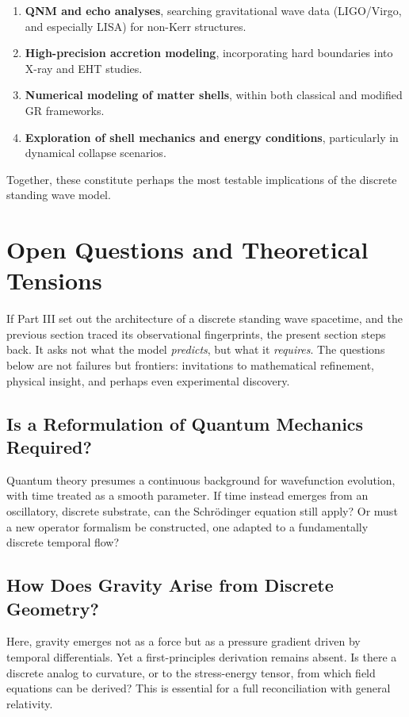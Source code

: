 \documentclass[12pt]{article}
\begin{document}
\begin{enumerate}
    \item \textbf{QNM and echo analyses}, searching gravitational wave data (LIGO/Virgo, and especially LISA) for non-Kerr structures.
    \item \textbf{High-precision accretion modeling}, incorporating hard boundaries into X-ray and EHT studies.
    \item \textbf{Numerical modeling of matter shells}, within both classical and modified GR frameworks.
    \item \textbf{Exploration of shell mechanics and energy conditions}, particularly in dynamical collapse scenarios.
\end{enumerate}

Together, these constitute perhaps the most testable implications of the discrete standing wave model.

\section{Open Questions and Theoretical Tensions}

If Part III set out the architecture of a discrete standing wave spacetime, and the previous section traced its observational fingerprints, the present section steps back. It asks not what the model \emph{predicts}, but what it \emph{requires}. The questions below are not failures but frontiers: invitations to mathematical refinement, physical insight, and perhaps even experimental discovery.

\subsection{Is a Reformulation of Quantum Mechanics Required?}

Quantum theory presumes a continuous background for wavefunction evolution, with time treated as a smooth parameter. If time instead emerges from an oscillatory, discrete substrate, can the Schrödinger equation still apply? Or must a new operator formalism be constructed, one adapted to a fundamentally discrete temporal flow?

\subsection{How Does Gravity Arise from Discrete Geometry?}

Here, gravity emerges not as a force but as a pressure gradient driven by temporal differentials. Yet a first-principles derivation remains absent. Is there a discrete analog to curvature, or to the stress-energy tensor, from which field equations can be derived? This is essential for a full reconciliation with general relativity.
\end{document}
